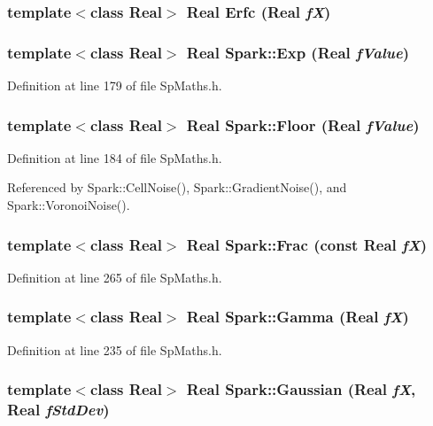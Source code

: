 \subsubsection{\setlength{\rightskip}{0pt plus 5cm}template$<$class Real$>$ Real Erfc (Real {\em f\-X})}\label{namespaceSpark_a36}


\subsubsection{\setlength{\rightskip}{0pt plus 5cm}template$<$class Real$>$ Real Spark::Exp (Real {\em f\-Value})}\label{namespaceSpark_a43}


Definition at line 179 of file Sp\-Maths.h.
\subsubsection{\setlength{\rightskip}{0pt plus 5cm}template$<$class Real$>$ Real Spark::Floor (Real {\em f\-Value})}\label{namespaceSpark_a44}


Definition at line 184 of file Sp\-Maths.h.

Referenced by Spark::Cell\-Noise(), Spark::Gradient\-Noise(), and Spark::Voronoi\-Noise().
\subsubsection{\setlength{\rightskip}{0pt plus 5cm}template$<$class Real$>$ Real Spark::Frac (const Real {\em f\-X})}\label{namespaceSpark_a58}


Definition at line 265 of file Sp\-Maths.h.
\subsubsection{\setlength{\rightskip}{0pt plus 5cm}template$<$class Real$>$ Real Spark::Gamma (Real {\em f\-X})}\label{namespaceSpark_a53}


Definition at line 235 of file Sp\-Maths.h.
\subsubsection{\setlength{\rightskip}{0pt plus 5cm}template$<$class Real$>$ Real Spark::Gaussian (Real {\em f\-X}, Real {\em f\-Std\-Dev})}\label{namespaceSpark_a54}


